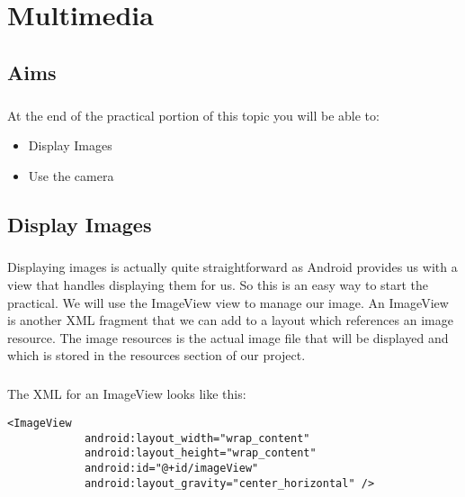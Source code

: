 \chapter{Multimedia}
\section{Aims}
\paragraph{} At the end of the practical portion of this topic you will be able to:

\begin{itemize}
\item Display Images
\item Use the camera
\end{itemize}

\section{Display Images}
\paragraph{} Displaying images is actually quite straightforward as Android provides us with a view that handles displaying them for us. So this is an easy way to start the practical. We will use the ImageView view to manage our image. An ImageView is another XML fragment that we can add to a layout which references an image resource. The image resources is the actual image file that will be displayed and which is stored in the resources section of our project.

\paragraph{} The XML for an ImageView looks like this:

\begin{lstlisting}
<ImageView
            android:layout_width="wrap_content"
            android:layout_height="wrap_content"
            android:id="@+id/imageView"
            android:layout_gravity="center_horizontal" />
\end{lstlisting}


